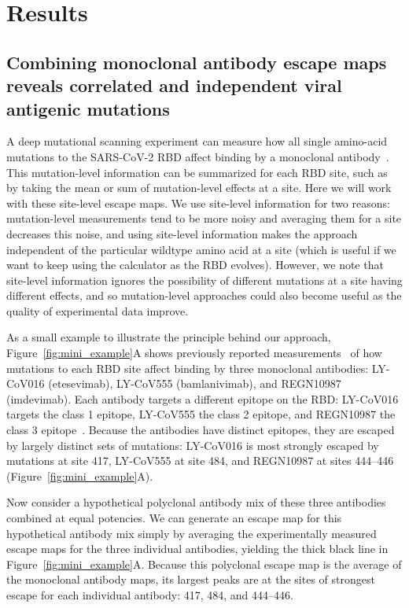\documentclass[9pt,twocolumn,twoside]{gsajnl_modified}
\begin{document}
\section{Results}

\subsection{Combining monoclonal antibody escape maps reveals correlated and independent viral antigenic mutations}
A deep mutational scanning experiment can measure how all single amino-acid mutations to the SARS-CoV-2 RBD affect binding by a monoclonal antibody~\citep{greaney2021complete}.
This mutation-level information can be summarized for each RBD site, such as by taking the mean or sum of mutation-level effects at a site.
Here we will work with these site-level escape maps.
We use site-level information for two reasons: mutation-level measurements tend to be more noisy and averaging them for a site decreases this noise, and using site-level information makes the approach independent of the particular wildtype amino acid at a site (which is useful if we want to keep using the calculator as the RBD evolves).
However, we note that site-level information ignores the possibility of different mutations at a site having different effects, and so mutation-level approaches could also become useful as the quality of experimental data improve.

As a small example to illustrate the principle behind our approach, Figure~\ref{fig:mini_example}A shows previously reported measurements~\citep{starr2021prospective, starr2021complete} of how mutations to each RBD site affect binding by three monoclonal antibodies: LY-CoV016 (etesevimab), LY-CoV555 (bamlanivimab), and REGN10987 (imdevimab).
Each antibody targets a different epitope on the RBD: LY-CoV016 targets the class 1 epitope, LY-CoV555 the class 2 epitope, and REGN10987 the class 3 epitope~\citep{barnes2020sars,greaney2021mapping}.
Because the antibodies have distinct epitopes, they are escaped by largely distinct sets of mutations: LY-CoV016 is most strongly escaped by mutations at site 417, LY-CoV555 at site 484, and REGN10987 at sites 444--446 (Figure~\ref{fig:mini_example}A).

Now consider a hypothetical polyclonal antibody mix of these three antibodies combined at equal potencies.
We can generate an escape map for this hypothetical antibody mix simply by averaging the experimentally measured escape maps for the three individual antibodies, yielding the thick black line in Figure~\ref{fig:mini_example}A.
Because this polyclonal escape map is the average of the monoclonal antibody maps, its largest peaks are at the sites of strongest escape for each individual antibody: 417, 484, and 444--446.
\end{document}
